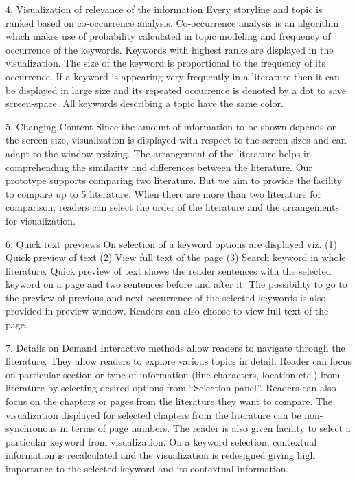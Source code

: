 4.	Visualization  of relevance of the information
Every storyline and topic is ranked based on co-occurrence analysis. Co-occurrence analysis is an algorithm which makes use of probability calculated in topic modeling and frequency of occurrence of the keywords. Keywords with highest ranks are displayed in the visualization. The size of the keyword is proportional to the frequency of its occurrence. If a keyword is appearing very frequently in a literature then it can be displayed in large size and its repeated occurrence is denoted by a dot to save screen-space. All keywords describing a topic have the same color.

5.	Changing Content
Since the amount of information to be shown depends on the screen size, visualization is displayed with respect to the screen sizes and can adapt to the window resizing. 
The arrangement of the literature helps in comprehending the similarity and differences between the literature. Our prototype supports comparing two literature. But we aim to provide the facility to compare up to 5 literature. When there are more than two literature for comparison, readers can select the order of the literature and the arrangements for visualization.

6.	Quick text previews
On selection of a keyword options are displayed viz. (1) Quick preview of text (2) View full text of the page (3) Search keyword in whole literature.
Quick preview of text shows the reader sentences with the selected keyword on a page and two sentences before and after it. The possibility to go to the preview of previous and next occurrence of the selected keywords is also provided in preview window. Readers can also choose to view full text of the page.

7.	Details on Demand
Interactive methods allow readers to navigate through the literature. They allow readers to explore various topics in detail. Reader can focus on particular section or type of information (line characters, location etc.) from literature by selecting desired options from “Selection panel”. Readers can also focus on the chapters or pages from the literature they want to compare. The visualization displayed for selected chapters from the literature can be non-synchronous in terms of page numbers.
The reader is also given facility to select a particular keyword from visualization. On a keyword selection, contextual information is recalculated and the visualization is redesigned giving high importance to the selected keyword and its contextual information.

